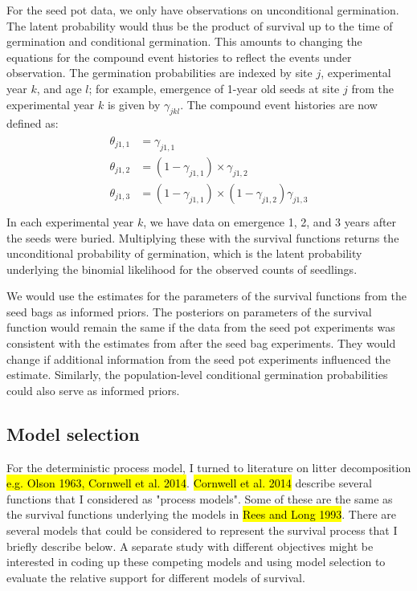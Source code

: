 \documentclass[12pt, oneside, titlepage]{article}   	%
\begin{document}
For the seed pot data, we only have observations on unconditional germination. The latent probability would thus be the product of survival up to the time of germination and conditional germination. This amounts to changing the equations for the compound event histories to reflect the events under observation. The germination probabilities are indexed by site $j$, experimental year $k$, and age $l$; for example, emergence of 1-year old seeds at site $j$ from the experimental year $k$ is given by $\gamma_{jkl}$. The compound event histories are now defined as:
\singlespace
%
\begin{align}
  \begin{split}
\theta_{j1,1} & = \gamma_{j1,1} \\
\theta_{j1,2} & = (1-\gamma_{j1,1}) \times \gamma_{j1,2} \\
\theta_{j1,3} & = (1-\gamma_{j1,1}) \times (1-\gamma_{j1,2}) \gamma_{j1,3} \\
  \end{split}
\end{align}
%
\doublespace
In each experimental year $k$, we have data on emergence 1, 2, and 3 years after the seeds were buried. Multiplying these with the survival functions returns the unconditional probability of germination, which is the latent probability underlying the binomial likelihood for the observed counts of seedlings.

We would use the estimates for the parameters of the survival functions from the seed bags as informed priors. The posteriors on parameters of the survival function would remain the same if the data from the seed pot experiments was consistent with the estimates from after the seed bag experiments. They would change if additional information from the seed pot experiments influenced the estimate. Similarly, the population-level conditional germination probabilities could also serve as informed priors. 

\subsection{Model selection}

For the deterministic process model, I turned to literature on litter decomposition \hl{e.g. Olson 1963, Cornwell et al. 2014}. \hl{Cornwell et al. 2014} describe several functions that I considered as "process models". Some of these are the same as the survival functions underlying the models in \hl{Rees and Long 1993}. There are several models that could be considered to represent the survival process that I briefly describe below. A separate study with different objectives might be interested in coding up these competing models and using model selection to evaluate the relative support for different models of survival. 
\end{document}
